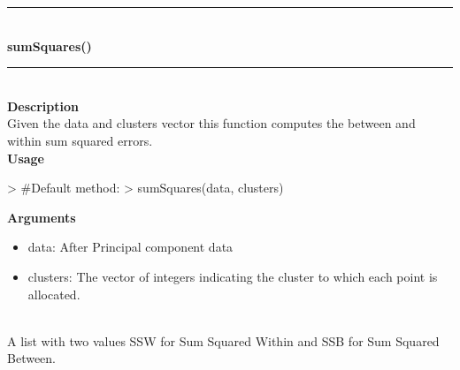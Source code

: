 \documentclass{article}
\begin{document}
\noindent\rule{14cm}{0.4pt}\\
{\bf \large sumSquares() } \\
\noindent\rule{14cm}{0.4pt}\\
{\bf Description}\\
Given the data and clusters vector this function computes the between and within sum squared errors.\\

{\bf Usage}\\

\begin{Schunk}
\begin{Sinput}
>   #Default method:
>   sumSquares(data, clusters)
\end{Sinput}
\end{Schunk}
{\bf Arguments}
\begin {itemize}
\item data: After Principal component data  
\item   clusters: The  vector of integers indicating the cluster to which each point is allocated.
\end {itemize}
\hspace*{5mm}{\bf Returns}\\

 A list with two values SSW for Sum Squared Within and SSB for Sum Squared Between.\\
\newpage
\end{document}
